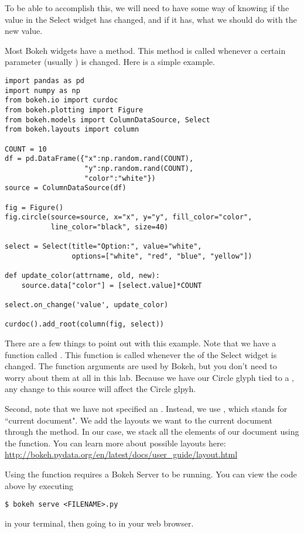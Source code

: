 To be able to accomplish this, we will need to have some way of knowing if the
value in the Select widget has changed, and if it has, what we should do with the
new value.

Most Bokeh widgets have a  method. This method is called whenever
a certain parameter (usually ) is changed. Here is a simple example.

\begin{lstlisting}
import pandas as pd
import numpy as np
from bokeh.io import curdoc
from bokeh.plotting import Figure
from bokeh.models import ColumnDataSource, Select
from bokeh.layouts import column

COUNT = 10
df = pd.DataFrame({"x":np.random.rand(COUNT),
                   "y":np.random.rand(COUNT),
                   "color":"white"})
source = ColumnDataSource(df)

fig = Figure()
fig.circle(source=source, x="x", y="y", fill_color="color",
           line_color="black", size=40)

select = Select(title="Option:", value="white",
                options=["white", "red", "blue", "yellow"])

def update_color(attrname, old, new):
    source.data["color"] = [select.value]*COUNT

select.on_change('value', update_color)

curdoc().add_root(column(fig, select))
\end{lstlisting}

There are a few things to point out with this example. Note that we have a function
called . This function is called whenever the  of
the Select widget is changed. The function arguments 
are used by Bokeh, but you don't need to worry about them at all in this lab.
Because we have our Circle glyph tied to a
, any change to this source will affect the Circle glpyh.

Second, note that we have not specified an . Instead, we use
, which stands for ``current document". We add the layouts we want
to the current document through the  method. In our case, we
stack all the elements of our document using the  function. You can
learn more about possible layouts here:
\url{http://bokeh.pydata.org/en/latest/docs/user_guide/layout.html}

Using the   function requires a Bokeh Server to be running.
You can view the code above by executing
\begin{lstlisting}
$ bokeh serve <FILENAME>.py
\end{lstlisting}
in your terminal, then going to  in your web
browser.

